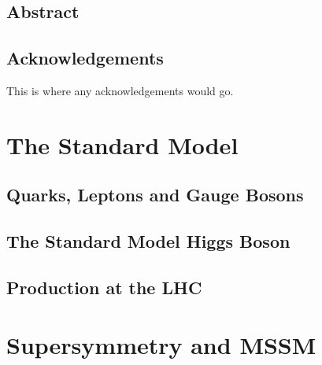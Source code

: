 \documentclass[oneside, letterpaper, 12pt, oldfontcommands]{memoir}
\begin{document}
\frontmatter


\thetitlepage
\clearpage

\thecopyrightpage
\cleardoublepage

\setcounter{page}{1}

\section{Abstract}
\uwabstract
\cleardoublepage

\section{Acknowledgements}
This is where any acknowledgements would go.
\clearpage

\tableofcontents* %
 \listoffigures*  %
 \listoftables   %

\mainmatter

\chapter{The Standard Model}

\section{Quarks, Leptons and Gauge Bosons}
\section{The Standard Model Higgs Boson}
\section{\bbbar Production at the LHC}

\chapter{Supersymmetry and MSSM}
\end{document}
